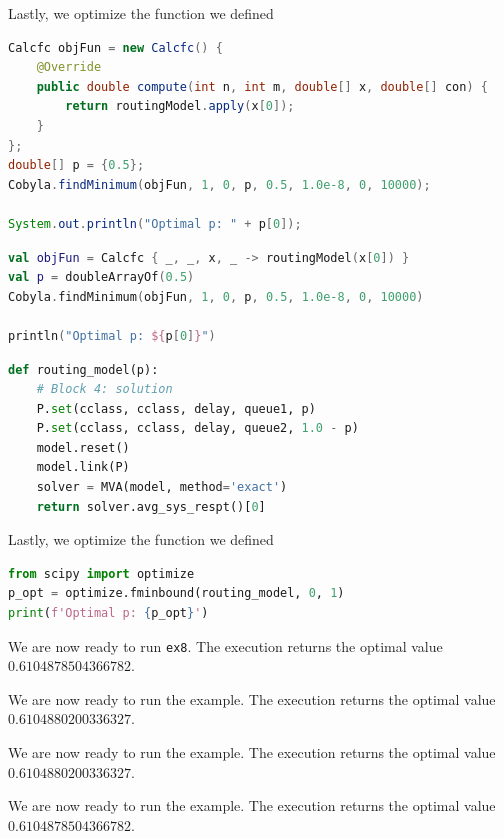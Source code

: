 Lastly, we optimize the function we defined
\begin{JAVA}
\begin{lstlisting}[language = java, basicstyle=\ttfamily\scriptsize]
Calcfc objFun = new Calcfc() {
    @Override
    public double compute(int n, int m, double[] x, double[] con) {
        return routingModel.apply(x[0]);
    }
};
double[] p = {0.5};
Cobyla.findMinimum(objFun, 1, 0, p, 0.5, 1.0e-8, 0, 10000);

System.out.println("Optimal p: " + p[0]);
\end{lstlisting}
\end{JAVA}
\begin{KOTLIN}
\begin{lstlisting}[language = kotlin, basicstyle=\ttfamily\scriptsize]
val objFun = Calcfc { _, _, x, _ -> routingModel(x[0]) }
val p = doubleArrayOf(0.5)
Cobyla.findMinimum(objFun, 1, 0, p, 0.5, 1.0e-8, 0, 10000)

println("Optimal p: ${p[0]}")
\end{lstlisting}
\end{KOTLIN}
\begin{PYTHON}
\begin{lstlisting}[language = python]
def routing_model(p):
    # Block 4: solution
    P.set(cclass, cclass, delay, queue1, p)
    P.set(cclass, cclass, delay, queue2, 1.0 - p)
    model.reset()
    model.link(P)
    solver = MVA(model, method='exact')
    return solver.avg_sys_respt()[0]
\end{lstlisting}
Lastly, we optimize the function we defined
\begin{lstlisting}[language = python]
from scipy import optimize
p_opt = optimize.fminbound(routing_model, 0, 1)
print(f'Optimal p: {p_opt}')
\end{lstlisting}
\end{PYTHON}
\begin{MATLAB}
We are now ready to run \texttt{ex8}. The execution returns the optimal value $0.6104878504366782$.
\end{MATLAB}
\begin{JAVA}
We are now ready to run the example. The execution returns the optimal value $0.6104880200336327$.
\end{JAVA}
\begin{KOTLIN}
We are now ready to run the example. The execution returns the optimal value $0.6104880200336327$.
\end{KOTLIN}
\begin{PYTHON}
We are now ready to run the example. The execution returns the optimal value $0.6104878504366782$.
\end{PYTHON}

